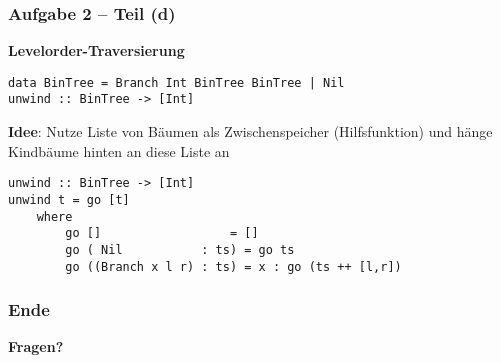 \documentclass{beamer}
\begin{document}
\begin{frame}[fragile] \frametitle{Aufgabe 2 -- Teil (d)}
	\small
	\textbf{Levelorder-Traversierung}
	
	\begin{lstlisting}[style=bg]
data BinTree = Branch Int BinTree BinTree | Nil 
unwind :: BinTree -> [Int]
	\end{lstlisting}
	\smallskip \pause
	
	\textbf{Idee}: Nutze Liste von Bäumen als Zwischenspeicher (Hilfsfunktion) und hänge Kindbäume hinten an diese Liste an
	\bigskip \pause
	
	\begin{lstlisting}[style=bg, tabsize=1]
unwind :: BinTree -> [Int]
unwind t = go [t]
	where
		go []                  = []
		go ( Nil           : ts) = go ts
		go ((Branch x l r) : ts) = x : go (ts ++ [l,r])
	\end{lstlisting}
\end{frame}

\begin{frame} \frametitle{Ende}
	\centering
	\textbf{Fragen?}
\end{frame}
\end{document}
